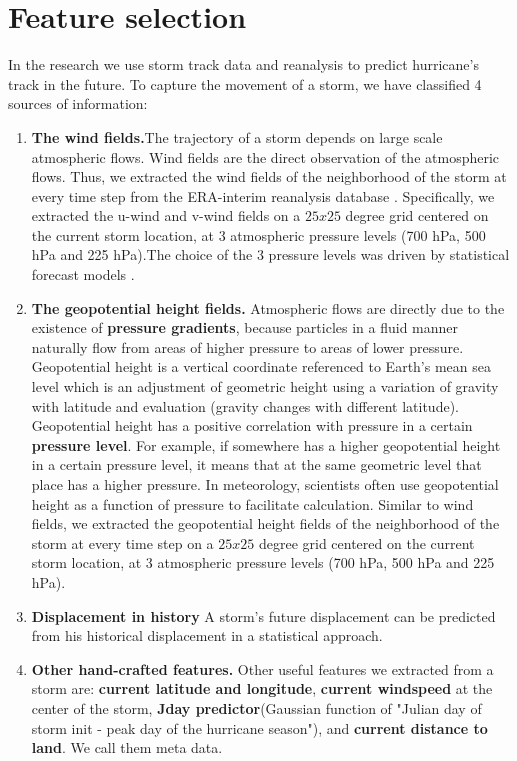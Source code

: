 \section{Feature selection}
In the research we use storm track data and reanalysis to predict hurricane's track in the future. To capture the movement of a storm, we have classified 4 sources of information: 
\begin{enumerate}[leftmargin=2em]
	\item \textbf{The wind fields.}The trajectory of a storm depends on large scale atmospheric flows. Wind fields are the direct observation of the atmospheric flows. Thus, we extracted the wind fields of the neighborhood of the storm at every time step from the ERA-interim reanalysis database \cite{dee2011era}. Specifically, we extracted the u-wind and v-wind fields on a $25x25$ degree grid centered on the current storm location, at 3 atmospheric pressure levels (700 hPa, 500 hPa and 225 hPa).The choice of the 3 pressure levels was driven by statistical forecast models \cite{demaria2005further}. 
	\item \textbf{The geopotential height fields.} Atmospheric flows are directly due to the existence of \textbf{pressure gradients}, because particles in a fluid manner naturally flow from areas of higher pressure to areas of lower pressure. Geopotential height is a vertical coordinate referenced to Earth's mean sea level which is an adjustment of geometric height using a variation of gravity with latitude and evaluation (gravity changes with different latitude). Geopotential height has a positive correlation with pressure in a certain \textbf{pressure level}. For example, if somewhere has a higher geopotential height in a certain pressure level, it means that at the same geometric level that place has a higher pressure. In meteorology, scientists often use geopotential height as a function of pressure to facilitate calculation. Similar to wind fields, we extracted the geopotential height fields of the neighborhood of the storm at every time step on a $25x25$ degree grid centered on the current storm location, at 3 atmospheric pressure levels (700 hPa, 500 hPa and 225 hPa).
	
	\item \textbf{Displacement in history} A storm's future displacement can be predicted from his historical displacement in a statistical approach.
	
	\item \textbf{Other hand-crafted features.}
	Other useful features we extracted from a storm are: \textbf{current latitude and longitude}, \textbf{current windspeed} at the center of the storm, \textbf{Jday predictor}(Gaussian function of "Julian day of storm init - peak day of the hurricane season"\cite{demaria2005further}), and \textbf{current distance to land}. We call them meta data.
\end{enumerate}

